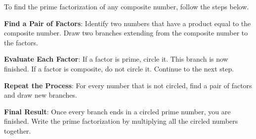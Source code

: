 \documentclass{ximera}[font=12pt]  %
\begin{document}
\begin{procedure}

To find the prime factorization of any composite number, follow the steps below.

\begin{description}[style=multiline, leftmargin=5em, font=\bfseries]

\item[Step 1] \textbf{Find a Pair of Factors}: Identify two numbers that have a product equal to the composite number.  
Draw two branches extending from the composite number to the factors.

\item[Step 2] \textbf{Evaluate Each Factor}: If a factor is prime, circle it. This branch is now finished.  If a factor is 
composite, do not circle it. Continue to the next step.

\item[Step 3] \textbf{Repeat the Process}: For every number that is not circled, find a pair of factors and draw new branches.


\item[Step 4] \textbf{Final Result}: Once every branch ends in a circled prime number, you are finished.  Write the prime factorization by multiplying all the circled numbers together.

\end{description}

\end{procedure}
\end{document}
